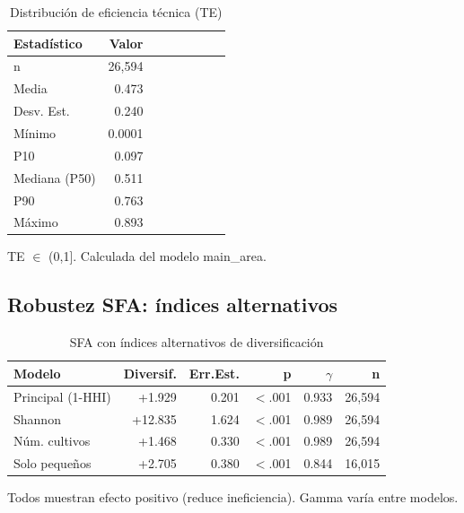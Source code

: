 \documentclass[11pt,a4paper]{article}
\begin{document}
\begin{table}[H]
\centering
\caption{Distribución de eficiencia técnica (TE)}
\label{tab:te_stats}
\begin{threeparttable}
\small
\begin{tabular}{lrrrrrrr}
\toprule
\textbf{Estadístico} & \textbf{Valor} \\
\midrule
n & 26,594 \\
Media & 0.473 \\
Desv. Est. & 0.240 \\
Mínimo & 0.0001 \\
P10 & 0.097 \\
Mediana (P50) & 0.511 \\
P90 & 0.763 \\
Máximo & 0.893 \\
\bottomrule
\end{tabular}
\begin{tablenotes}
\footnotesize
\item TE $\in$ (0,1]. Calculada del modelo main\_area.
\end{tablenotes}
\end{threeparttable}
\end{table}

\subsection{Robustez SFA: índices alternativos}

\begin{table}[H]
\centering
\caption{SFA con índices alternativos de diversificación}
\label{tab:sfa_robustness}
\begin{threeparttable}
\small
\begin{tabular}{lrrrrr}
\toprule
\textbf{Modelo} & \textbf{Diversif.} & \textbf{Err.Est.} & \textbf{p} & \textbf{$\gamma$} & \textbf{n} \\
\midrule
Principal (1-HHI) & +1.929 & 0.201 & $<$.001 & 0.933 & 26,594 \\
Shannon & +12.835 & 1.624 & $<$.001 & 0.989 & 26,594 \\
Núm. cultivos & +1.468 & 0.330 & $<$.001 & 0.989 & 26,594 \\
Solo pequeños & +2.705 & 0.380 & $<$.001 & 0.844 & 16,015 \\
\bottomrule
\end{tabular}
\begin{tablenotes}
\footnotesize
\item Todos muestran efecto positivo (reduce ineficiencia). Gamma varía entre modelos.
\end{tablenotes}
\end{threeparttable}
\end{table}
\end{document}
